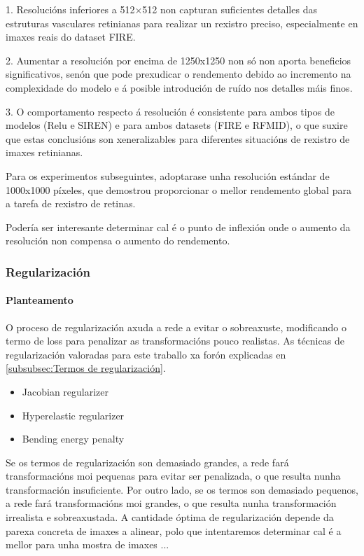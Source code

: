 1. Resolucións inferiores a 512×512 non capturan suficientes detalles das estruturas vasculares retinianas para realizar un rexistro preciso, especialmente en imaxes reais do dataset FIRE.

2. Aumentar a resolución por encima de 1250x1250 non só non aporta beneficios significativos, senón que pode prexudicar o rendemento debido ao incremento na complexidade do modelo e á posible introdución de ruído nos detalles máis finos.

3. O comportamento respecto á resolución é consistente para ambos tipos de modelos (Relu e SIREN) e para ambos datasets (FIRE e RFMID), o que suxire que estas conclusións son xeneralizables para diferentes situacións de rexistro de imaxes retinianas.

Para os experimentos subseguintes, adoptarase unha resolución estándar de 1000x1000 píxeles, que demostrou proporcionar o mellor rendemento global para a tarefa de rexistro de retinas.

Podería ser interesante determinar cal é o punto de inflexión onde o aumento da resolución non compensa o aumento do rendemento.

\subsubsection{Regularización}
\label{subsubsec:Regularización}

\paragraph{Planteamento}
\label{par:Planteamento}

O proceso de regularización axuda a rede a evitar o sobreaxuste, modificando o termo de loss para penalizar as transformacións pouco realistas.
As técnicas de regularización valoradas para este traballo xa forón explicadas en \ref{subsubsec:Termos de regularización}.

\begin{itemize}
    \item Jacobian regularizer
    \item Hyperelastic regularizer
    \item Bending energy penalty
\end{itemize}

Se os termos de regularización son demasiado grandes, a rede fará transformacións moi pequenas para evitar ser penalizada, o que resulta nunha transformación insuficiente.
Por outro lado, se os termos son demasiado pequenos, a rede fará transformacións moi grandes, o que resulta nunha transformación irrealista e sobreaxustada.
A cantidade óptima de regularización depende da parexa concreta de imaxes a alinear, polo que intentaremos determinar cal é a mellor para unha mostra de imaxes ...

